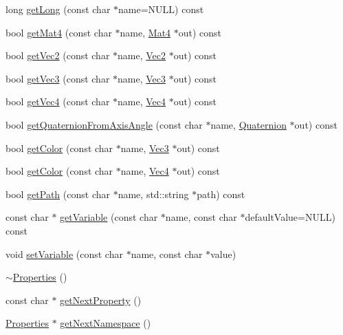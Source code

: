 \begin{DoxyCompactItemize}
\item 
long \hyperlink{classProperties_af288a30f0ad39ebf37a8415f0716ddd7}{get\+Long} (const char $\ast$name=N\+U\+LL) const
\item 
bool \hyperlink{classProperties_adf89d5ec337d5cd247b79b6083c820d8}{get\+Mat4} (const char $\ast$name, \hyperlink{classMat4}{Mat4} $\ast$out) const
\item 
bool \hyperlink{classProperties_ad1eacd687cc1f90c31dba67e071aac62}{get\+Vec2} (const char $\ast$name, \hyperlink{classVec2}{Vec2} $\ast$out) const
\item 
bool \hyperlink{classProperties_a5ea69d8939c4f73a4f271c5ebc1ff718}{get\+Vec3} (const char $\ast$name, \hyperlink{classVec3}{Vec3} $\ast$out) const
\item 
bool \hyperlink{classProperties_a10f930a0553b781cb2de09c6b738f15e}{get\+Vec4} (const char $\ast$name, \hyperlink{classVec4}{Vec4} $\ast$out) const
\item 
bool \hyperlink{classProperties_a609e433cb5798c88b2f87ef036ed3a73}{get\+Quaternion\+From\+Axis\+Angle} (const char $\ast$name, \hyperlink{classQuaternion}{Quaternion} $\ast$out) const
\item 
bool \hyperlink{classProperties_aef61d49b456e4efbf6668a079b14780d}{get\+Color} (const char $\ast$name, \hyperlink{classVec3}{Vec3} $\ast$out) const
\item 
bool \hyperlink{classProperties_a8fd1e181c6cb58cda989db6eca09ef4d}{get\+Color} (const char $\ast$name, \hyperlink{classVec4}{Vec4} $\ast$out) const
\item 
bool \hyperlink{classProperties_a721bf4ef8c0669161a29068ab79fda90}{get\+Path} (const char $\ast$name, std\+::string $\ast$path) const
\item 
const char $\ast$ \hyperlink{classProperties_add5e270ee2eb7795384e7712e21c3846}{get\+Variable} (const char $\ast$name, const char $\ast$default\+Value=N\+U\+LL) const
\item 
void \hyperlink{classProperties_aea588dde95d1d4767d981a2530a202b0}{set\+Variable} (const char $\ast$name, const char $\ast$value)
\item 
\hyperlink{classProperties_a9a4367c64d90a962fc260128587670dd}{$\sim$\+Properties} ()
\item 
const char $\ast$ \hyperlink{classProperties_a30173ee790d8dc35635723647883e1a0}{get\+Next\+Property} ()
\item 
\hyperlink{classProperties}{Properties} $\ast$ \hyperlink{classProperties_aa5db87165b6b56f6ad0a2d4e8b95a6f9}{get\+Next\+Namespace} ()
\item 

\end{DoxyCompactItemize}

